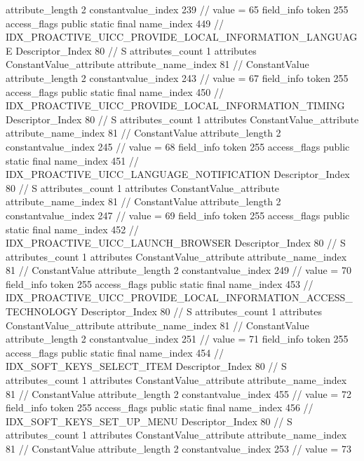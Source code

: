 {{{{{{{					attribute_length	2
					constantvalue_index	239		// value = 65
				}
				}
			}
			field_info {
				token	255
				access_flags	public static final
				name_index	449		// IDX_PROACTIVE_UICC_PROVIDE_LOCAL_INFORMATION_LANGUAGE
				Descriptor_Index	80		// S
				attributes_count	1
				attributes {
				ConstantValue_attribute {
					attribute_name_index	81		// ConstantValue
					attribute_length	2
					constantvalue_index	243		// value = 67
				}
				}
			}
			field_info {
				token	255
				access_flags	public static final
				name_index	450		// IDX_PROACTIVE_UICC_PROVIDE_LOCAL_INFORMATION_TIMING
				Descriptor_Index	80		// S
				attributes_count	1
				attributes {
				ConstantValue_attribute {
					attribute_name_index	81		// ConstantValue
					attribute_length	2
					constantvalue_index	245		// value = 68
				}
				}
			}
			field_info {
				token	255
				access_flags	public static final
				name_index	451		// IDX_PROACTIVE_UICC_LANGUAGE_NOTIFICATION
				Descriptor_Index	80		// S
				attributes_count	1
				attributes {
				ConstantValue_attribute {
					attribute_name_index	81		// ConstantValue
					attribute_length	2
					constantvalue_index	247		// value = 69
				}
				}
			}
			field_info {
				token	255
				access_flags	public static final
				name_index	452		// IDX_PROACTIVE_UICC_LAUNCH_BROWSER
				Descriptor_Index	80		// S
				attributes_count	1
				attributes {
				ConstantValue_attribute {
					attribute_name_index	81		// ConstantValue
					attribute_length	2
					constantvalue_index	249		// value = 70
				}
				}
			}
			field_info {
				token	255
				access_flags	public static final
				name_index	453		// IDX_PROACTIVE_UICC_PROVIDE_LOCAL_INFORMATION_ACCESS_TECHNOLOGY
				Descriptor_Index	80		// S
				attributes_count	1
				attributes {
				ConstantValue_attribute {
					attribute_name_index	81		// ConstantValue
					attribute_length	2
					constantvalue_index	251		// value = 71
				}
				}
			}
			field_info {
				token	255
				access_flags	public static final
				name_index	454		// IDX_SOFT_KEYS_SELECT_ITEM
				Descriptor_Index	80		// S
				attributes_count	1
				attributes {
				ConstantValue_attribute {
					attribute_name_index	81		// ConstantValue
					attribute_length	2
					constantvalue_index	455		// value = 72
				}
				}
			}
			field_info {
				token	255
				access_flags	public static final
				name_index	456		// IDX_SOFT_KEYS_SET_UP_MENU
				Descriptor_Index	80		// S
				attributes_count	1
				attributes {
				ConstantValue_attribute {
					attribute_name_index	81		// ConstantValue
					attribute_length	2
					constantvalue_index	253		// value = 73
}}}}}}}
